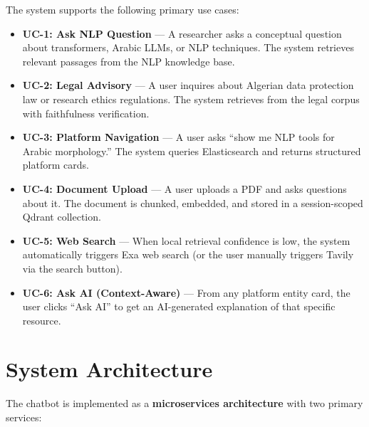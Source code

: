 \documentclass[12pt, a4paper]{article}
\begin{document}
The system supports the following primary use cases:
\begin{itemize}[leftmargin=2em]
  \item \textbf{UC-1: Ask NLP Question} --- A researcher asks a conceptual
        question about transformers, Arabic LLMs, or NLP techniques. The
        system retrieves relevant passages from the NLP knowledge base.
  \item \textbf{UC-2: Legal Advisory} --- A user inquires about Algerian
        data protection law or research ethics regulations. The system
        retrieves from the legal corpus with faithfulness verification.
  \item \textbf{UC-3: Platform Navigation} --- A user asks ``show me NLP
        tools for Arabic morphology.'' The system queries Elasticsearch
        and returns structured platform cards.
  \item \textbf{UC-4: Document Upload} --- A user uploads a PDF and asks
        questions about it. The document is chunked, embedded, and stored
        in a session-scoped Qdrant collection.
  \item \textbf{UC-5: Web Search} --- When local retrieval confidence is
        low, the system automatically triggers Exa web search (or the user
        manually triggers Tavily via the search button).
  \item \textbf{UC-6: Ask AI (Context-Aware)} --- From any platform entity
        card, the user clicks ``Ask AI'' to get an AI-generated explanation
        of that specific resource.
\end{itemize}


\section{System Architecture}
\label{sec:architecture}

The chatbot is implemented as a \textbf{microservices architecture} with two
primary services:
\end{document}
